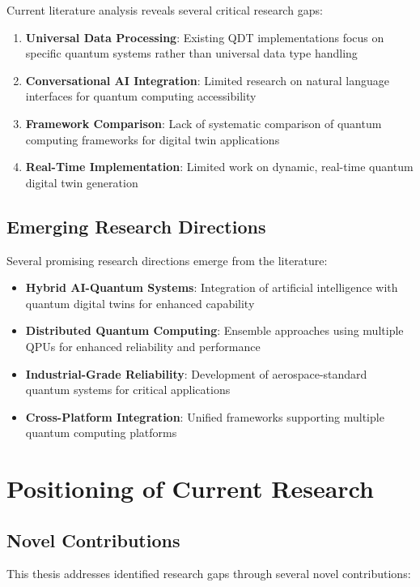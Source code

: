 Current literature analysis reveals several critical research gaps:

\begin{enumerate}
    \item \textbf{Universal Data Processing}: Existing QDT implementations focus on specific quantum systems rather than universal data type handling
    \item \textbf{Conversational AI Integration}: Limited research on natural language interfaces for quantum computing accessibility
    \item \textbf{Framework Comparison}: Lack of systematic comparison of quantum computing frameworks for digital twin applications
    \item \textbf{Real-Time Implementation}: Limited work on dynamic, real-time quantum digital twin generation
\end{enumerate}

\subsection{Emerging Research Directions}

Several promising research directions emerge from the literature:

\begin{itemize}
    \item \textbf{Hybrid AI-Quantum Systems}: Integration of artificial intelligence with quantum digital twins for enhanced capability
    \item \textbf{Distributed Quantum Computing}: Ensemble approaches using multiple QPUs for enhanced reliability and performance
    \item \textbf{Industrial-Grade Reliability}: Development of aerospace-standard quantum systems for critical applications
    \item \textbf{Cross-Platform Integration}: Unified frameworks supporting multiple quantum computing platforms
\end{itemize}

\section{Positioning of Current Research}

\subsection{Novel Contributions}

This thesis addresses identified research gaps through several novel contributions:

